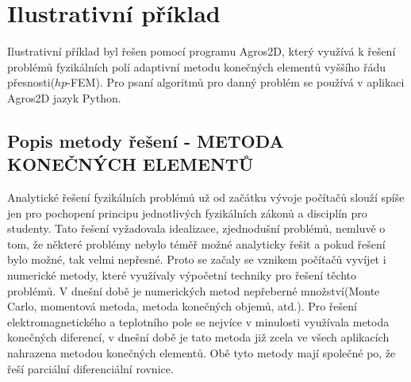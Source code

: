 \chapter{Ilustrativní příklad} 
\label{ilustrativni_priklad}
Ilustrativní příklad byl řešen pomocí programu Agros2D, který využívá k řešení problémů fyzikálních polí adaptivní metodu konečných elementů vyššího řádu přesnosti($hp$-FEM). Pro psaní algoritmů pro danný problém se používá v aplikaci Agros2D jazyk Python.
\section{Popis metody řešení - METODA KONEČNÝCH ELEMENTŮ}
Analytické řešení fyzikálních problémů už od začátku vývoje počítačů slouží spíše jen pro pochopení principu jednotlivých fyzikálních zákonů a disciplín pro studenty. Tato řešení vyžadovala idealizace, zjednodušní problémů, nemluvě o tom, že některé problémy nebylo téměř možné analyticky řešit a pokud řešení bylo možné, tak velmi nepřesné. Proto se začaly se vznikem počítačů vyvíjet i numerické metody, které využívaly výpočetní techniky pro řešení těchto problémů. V dnešní době je numerických metod nepřeberné množství(Monte Carlo, momentová metoda, metoda konečných objemů, atd.). Pro řešení elektromagnetického a teplotního pole se nejvíce v minulosti využívala metoda konečných diferencí, v dnešní době je tato metoda již zcela ve všech aplikacích nahrazena metodou konečných elementů. Obě tyto metody mají společné po, že řeší parciální diferenciální rovnice.


